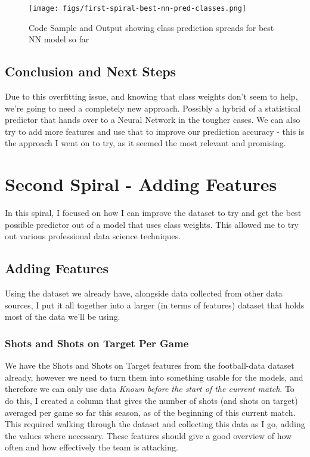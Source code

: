 \documentclass[12pt,a4paper,twoside,openright]{report}
\begin{document}
\begin{figure}[h]
  \centering
  \texttt{[image: figs/first-spiral-best-nn-pred-classes.png]}
  \caption{Code Sample and Output showing class prediction spreads for best NN model so far}
  \label{fig:first-spiral-best-nn-pred-classes}
\end{figure}

\subsection{Conclusion and Next Steps}

Due to this overfitting issue, and knowing that class weights don't seem to help, we're going to need a completely new approach. Possibly a hybrid of a statistical predictor that hands over to a Neural Network in the tougher cases. We can also try to add more features and use that to improve our prediction accuracy - this is the approach I went on to try, as it seemed the most relevant and promising.

\section{Second Spiral - Adding Features}

In this spiral, I focused on how I can improve the dataset to try and get the best possible predictor out of a model that uses class weights. This allowed me to try out various professional data science techniques.

\subsection{Adding Features}

Using the dataset we already have, alongside data collected from other data sources, I put it all together into a larger (in terms of features) dataset that holds most of the data we'll be using.

\subsubsection{Shots and Shots on Target Per Game}

We have the Shots and Shots on Target features from the football-data dataset already, however we need to turn them into something usable for the models, and therefore we can only use data \textit{Known before the start of the current match}. To do this, I created a column that gives the number of shots (and shots on target) averaged per game so far this season, as of the beginning of this current match. This required walking through the dataset and collecting this data as I go, adding the values where necessary. These features should give a good overview of how often and how effectively the team is attacking.
\end{document}

